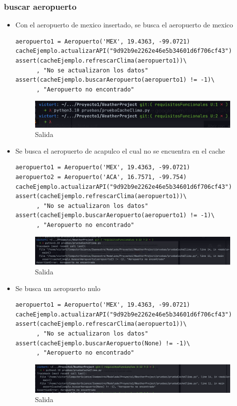 \documentclass[12pt]{article}
\begin{document}
\subsubsection{buscar aeropuerto}
\begin{itemize}
\item Con el aeropuerto de mexico insertado, se busca el aeropuerto de mexico
\begin{verbatim}
aeropuerto1 = Aeropuerto('MEX', 19.4363, -99.0721)
cacheEjemplo.actualizarAPI("9d92b9e2262e46e5b34601d6f706cf43")
assert(cacheEjemplo.refrescarClima(aeropuerto1))\
      , "No se actualizaron los datos"
assert(cacheEjemplo.buscarAeropuerto(aeropuerto1) != -1)\
      , "Aeropuerto no encontrado"
\end{verbatim}
\begin{figure}[h!]
    \centering
    \includegraphics[scale=0.7]{pruebasPy/cache/bien.png}
    \caption{Salida}
  \end{figure}
\item Se busca el aeropuerto de acapulco el cual no se encuentra en el cache
\begin{verbatim}
aeropuerto1 = Aeropuerto('MEX', 19.4363, -99.0721)
aeropuerto2 = Aeropuerto('ACA', 16.7571, -99.754)
cacheEjemplo.actualizarAPI("9d92b9e2262e46e5b34601d6f706cf43")
assert(cacheEjemplo.refrescarClima(aeropuerto1))\
      , "No se actualizaron los datos"
assert(cacheEjemplo.buscarAeropuerto(aeropuerto1) != -1)\
      , "Aeropuerto no encontrado"
\end{verbatim}
  \newpage
 \begin{figure}[h!]
    \centering
    \includegraphics[scale=0.4]{pruebasPy/cache/aeroNoEncontrado.png}
    \caption{Salida}
  \end{figure}
\item Se busca un aeropuerto nulo
\begin{verbatim}
aeropuerto1 = Aeropuerto('MEX', 19.4363, -99.0721)
cacheEjemplo.actualizarAPI("9d92b9e2262e46e5b34601d6f706cf43")
assert(cacheEjemplo.refrescarClima(aeropuerto1))\
      , "No se actualizaron los datos"
assert(cacheEjemplo.buscarAeropuerto(None) != -1)\
      , "Aeropuerto no encontrado"
\end{verbatim}
  \begin{figure}[h!]
    \centering
    \includegraphics[scale=0.4]{pruebasPy/cache/buscaNone.png}
    \caption{Salida}
  \end{figure}
\end{itemize}
\end{document}
